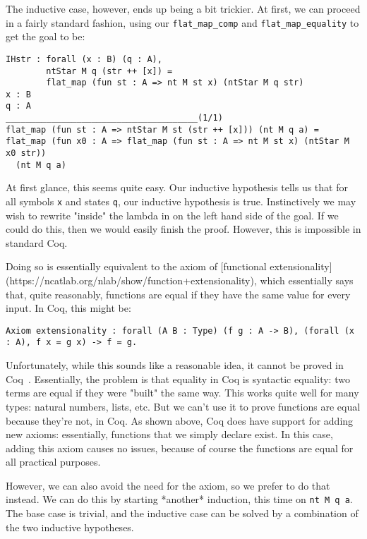 The inductive case, however, ends up being a bit trickier.
At first, we can proceed in a fairly standard fashion, using our \texttt{flat_map_comp} and \texttt{flat_map_equality} to get the goal to be:

\begin{verbatim}
IHstr : forall (x : B) (q : A),
        ntStar M q (str ++ [x]) =
        flat_map (fun st : A => nt M st x) (ntStar M q str)
x : B
q : A
______________________________________(1/1)
flat_map (fun st : A => ntStar M st (str ++ [x])) (nt M q a) =
flat_map (fun x0 : A => flat_map (fun st : A => nt M st x) (ntStar M x0 str))
  (nt M q a)
\end{verbatim}

At first glance, this seems quite easy.
Our inductive hypothesis tells us that for all symbols \texttt{x} and states \texttt{q}, our inductive hypothesis is true.
Instinctively we may wish to rewrite "inside" the lambda in on the left hand side of the goal.
If we could do this, then we would easily finish the proof.
However, this is impossible in standard Coq.

Doing so is essentially equivalent to the axiom of [functional extensionality](https://ncatlab.org/nlab/show/function+extensionality), which essentially says that, quite reasonably, functions are equal if they have the same value for every input.
In Coq, this might be:

\begin{verbatim}
Axiom extensionality : forall (A B : Type) (f g : A -> B), (forall (x : A), f x = g x) -> f = g.
\end{verbatim}

Unfortunately, while this sounds like a reasonable idea, it cannot be proved in Coq~\cite{coq-axioms}.
Essentially, the problem is that equality in Coq is syntactic equality: two terms are equal if they were "built" the same way.
This works quite well for many types: natural numbers, lists, etc.
But we can't use it to prove functions are equal because they're not, in Coq.
As shown above, Coq does have support for adding new axioms: essentially, functions that we simply declare exist.
In this case, adding this axiom causes no issues, because of course the functions are equal for all practical purposes.

However, we can also avoid the need for the axiom, so we prefer to do that instead.
We can do this by starting *another* induction, this time on \texttt{nt M q a}.
The base case is trivial, and the inductive case can be solved by a combination of the two inductive hypotheses.

